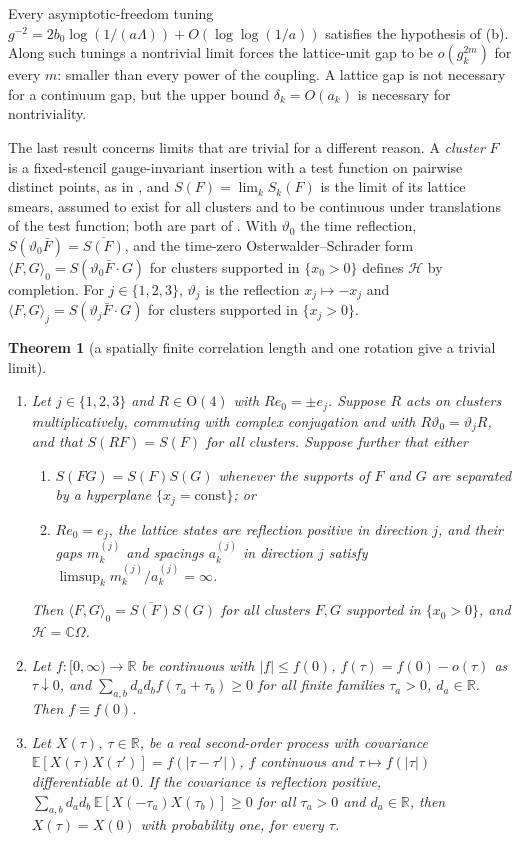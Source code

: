 \documentclass[11pt,a4paper]{amsart}
\newtheorem{theorem}{Theorem}[section]
\theoremstyle{definition}
\theoremstyle{remark}
\numberwithin{equation}{section}
\newcommand{\R}{\mathbb{R}}          %
\newcommand{\C}{\mathbb{C}}          %
\newcommand{\Hilb}{\mathcal{H}}      %
\newcommand{\ip}[2]{\langle #1,#2\rangle}  %
\newcommand{\abs}[1]{\lvert #1\rvert}      %
\newcommand{\hypW}{\text{\upshape(W)}}              %
\begin{document}
Every asymptotic-freedom tuning $g^{-2}=2b_0\log(1/(a\Lambda))+O(\log\log(1/a))$ satisfies the hypothesis of (b). Along such tunings a nontrivial limit forces the lattice-unit gap to be $o(g_k^{2m})$ for every $m$: smaller than every power of the coupling. A lattice gap is not necessary for a continuum gap, but the upper bound $\delta_k=O(a_k)$ is necessary for nontriviality.

The last result concerns limits that are trivial for a different reason. A \emph{cluster} $F$ is a fixed-stencil gauge-invariant insertion with a test function on pairwise distinct points, as in \cite[Definition~3]{bhattacharjee2026first}, and $S(F)=\lim_kS_k(F)$ is the limit of its lattice smears, assumed to exist for all clusters and to be continuous under translations of the test function; both are part of \hypW. With $\vartheta_0$ the time reflection, $S(\vartheta_0\bar F)=\overline{S(F)}$, and the time-zero Osterwalder--Schrader form $\ip FG_0=S(\vartheta_0\bar F\cdot G)$ for clusters supported in $\{x_0>0\}$ defines $\Hilb$ by completion. For $j\in\{1,2,3\}$, $\vartheta_j$ is the reflection $x_j\mapsto-x_j$ and $\ip FG_j=S(\vartheta_j\bar F\cdot G)$ for clusters supported in $\{x_j>0\}$.

\begin{theorem}[a spatially finite correlation length and one rotation give a trivial limit]\label{thm:rotation-triviality}
\leavevmode
\begin{enumerate}[label=\textup{(\alph*)},leftmargin=*]
\item Let $j\in\{1,2,3\}$ and $R\in\mathrm O(4)$ with $Re_0=\pm e_j$. Suppose $R$ acts on clusters multiplicatively, commuting with complex conjugation and with $R\vartheta_0=\vartheta_jR$, and that $S(RF)=S(F)$ for all clusters. Suppose further that either
\begin{enumerate}[label=\textup{(a\arabic*)},leftmargin=*]
\item $S(FG)=S(F)S(G)$ whenever the supports of $F$ and $G$ are separated by a hyperplane $\{x_j=\mathrm{const}\}$; or
\item $Re_0=e_j$, the lattice states are reflection positive in direction $j$, and their gaps $m^{(j)}_k$ and spacings $a^{(j)}_k$ in direction $j$ satisfy $\limsup_km^{(j)}_k/a^{(j)}_k=\infty$.
\end{enumerate}
Then $\ip FG_0=\overline{S(F)}S(G)$ for all clusters $F,G$ supported in $\{x_0>0\}$, and $\Hilb=\C\Omega$.
\item Let $f\colon[0,\infty)\to\R$ be continuous with $\abs f\le f(0)$, $f(\tau)=f(0)-o(\tau)$ as $\tau\downarrow0$, and $\sum_{a,b}d_ad_bf(\tau_a+\tau_b)\ge0$ for all finite families $\tau_a>0$, $d_a\in\R$. Then $f\equiv f(0)$.
\item Let $X(\tau)$, $\tau\in\R$, be a real second-order process with covariance $\mathbb E[X(\tau)X(\tau')]=f(\abs{\tau-\tau'})$, $f$ continuous and $\tau\mapsto f(\abs\tau)$ differentiable at $0$. If the covariance is reflection positive, $\sum_{a,b}d_ad_b\,\mathbb E[X(-\tau_a)X(\tau_b)]\ge0$ for all $\tau_a>0$ and $d_a\in\R$, then $X(\tau)=X(0)$ with probability one, for every $\tau$.
\end{enumerate}
\end{theorem}
\end{document}
